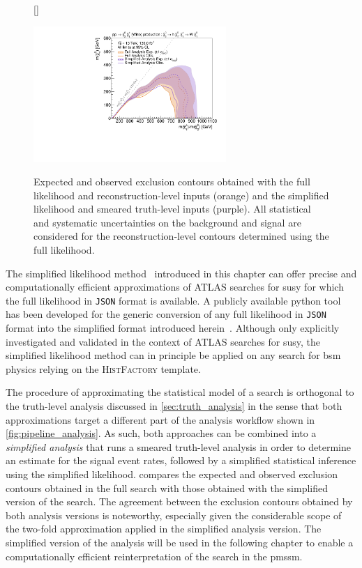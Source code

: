\begin{figure}
[\FBwidth]
{\caption{Expected and observed exclusion contours obtained with the full likelihood and reconstruction-level inputs (orange) and the simplified likelihood and smeared truth-level inputs (purple). All statistical and systematic uncertainties on the background and signal are considered for the reconstruction-level contours determined using the full likelihood.}\label{fig:exclusion_1Lbb_truthInput_BkgSignal_700_200_noLabel}}
{\includegraphics[width=0.65\textwidth]{exclusion_1Lbb_truthInput_BkgSignal_700_200_noLabel_v2}}
\end{figure}

The simplified likelihood method~\cite{Schanet:2758958} introduced in this chapter can offer precise and computationally efficient approximations of ATLAS searches for \gls{susy} for which the full likelihood in \texttt{JSON} format is available. A publicly available python tool has been developed for the generic conversion of any full likelihood in \texttt{JSON} format into the simplified format introduced herein~\cite{simplify}. Although only explicitly investigated and validated in the context of ATLAS searches for \gls{susy}, the simplified likelihood method can in principle be applied on any search for \gls{bsm} physics relying on the \textsc{HistFactory} template.

The procedure of approximating the statistical model of a search is orthogonal to the truth-level analysis discussed in \cref{sec:truth_analysis} in the sense that both approximations target a different part of the analysis workflow shown in \cref{fig:pipeline_analysis}.
As such, both approaches can be combined into a \textit{simplified analysis} that runs a smeared truth-level analysis in order to determine an estimate for the signal event rates, followed by a simplified statistical inference using the simplified likelihood.
 compares the expected and observed exclusion contours obtained in the full \onelepton search with those obtained with the simplified version of the search.
The agreement between the exclusion contours obtained by both analysis versions is noteworthy, especially given the considerable scope of the two-fold approximation applied in the simplified analysis version.
The simplified version of the \onelepton analysis will be used in the following chapter to enable a computationally efficient reinterpretation of the \onelepton search in the \gls{pmssm}.



